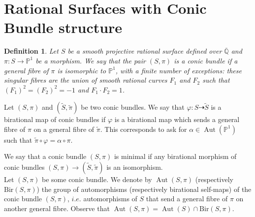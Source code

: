 \documentclass[leqno,12pt]{amsart} %
\newtheorem{defi}[thm]{Definition}
\newcommand{\Q}{\ensuremath{\mathbb{Q} }}
\newcommand{\p}{\ensuremath{\mathbb{P} }}
\DeclareMathOperator{\Aut}{Aut}
\begin{document}
\section{Rational Surfaces with Conic Bundle structure}
 
\begin{defi}\label{def-15}
    Let $S$ be a smooth projective rational surface defined over $ \overline{\Q}$ and $\pi : S\rightarrow \p^1$ be a morphism. We say that the pair $(S,\pi)$ is a conic bundle if a general fibre of $\pi$ is isomorphic to $\p^1$, with a finite number of exceptions: these singular fibres are the union of smooth rational curves $F_1$ and $F_2$ such that $(F_1)^2 = (F_2)^2 =-1$ and $F_1 · F_2 = 1$.
\end{defi}
Let $(S,\pi)$ and $( \tilde{S},\tilde{\pi})$ be two conic bundles. We say that $\varphi:S\dashrightarrow\tilde{S}$ is a birational map of conic bundles if $\varphi$ is a birational map which sends a general fibre of $\pi$ on a general fibre of $\tilde{\pi}$. This corresponds to ask for $\alpha\in\Aut(\p^1)$ such that $\tilde{\pi}\circ\varphi=\alpha\circ\pi$.
 
We say that a conic bundle $(S,\pi)$ is minimal if any birational morphism of conic bundles $(S,\pi)\rightarrow(\tilde{S},\tilde{\pi})$ is an isomorphism.\\
 
Let $(S, \pi)$ be some conic bundle. We denote by $\Aut(S, \pi)$ (respectively $\mathrm{Bir}(S, \pi)$) the group of automorphisms (respectively birational self-maps) of the conic bundle $(S,\pi)$, $i.e.$ automorphisms of $S$ that send a general fibre of $\pi$ on another general fibre. Observe that $\Aut(S, \pi) = \Aut(S) \cap \mathrm{Bir}(S, \pi)$.
\end{document}
